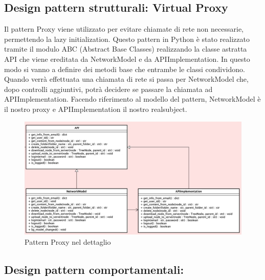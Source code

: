 \subsection{Design pattern strutturali: Virtual Proxy}
Il pattern Proxy viene utilizzato per evitare chiamate di rete non necessarie, permettendo la lazy initialization.\newline{}
Questo pattern in Python è stato realizzato tramite il modulo ABC (Abstract Base Classes) realizzando la classe astratta API che viene ereditata da NetworkModel e da APIImplementation. In questo modo si vanno a definire dei metodi base che entrambe le classi condividono. Quando verrà effettuata una chiamata di rete si passa per NetworkModel che, dopo controlli aggiuntivi, potrà decidere se passare la chiamata ad APIImplementation. Facendo riferimento al modello del pattern, NetworkModel è il nostro proxy e APIImplementation il nostro realsubject.
\begin{figure}[H]
    \centering
    \includegraphics[scale = 0.45]{components/img/proxy-model.png}
    \caption{Pattern Proxy nel dettaglio}
    \label{fig:Pattern proxy nel dettaglio}
\end{figure}
\subsection{Design pattern comportamentali:}
